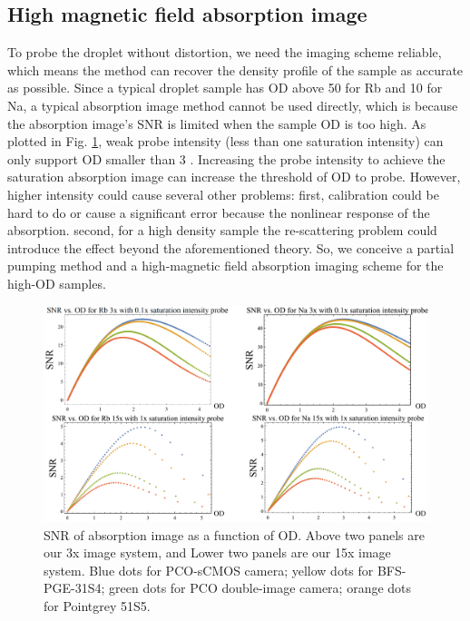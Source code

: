 \subsection{High magnetic field absorption image}
\label{subsec:high_mag_absop_image}

To probe the droplet without distortion, we need the imaging scheme reliable, which means the method can recover the density profile of the sample as accurate as possible. Since a typical droplet sample has OD above 50 for Rb and 10 for Na, a typical absorption image method cannot be used directly, which is because the absorption image's SNR is limited when the sample OD is too high. As plotted in Fig. \ref{SNR_OD}, weak probe intensity (less than one saturation intensity) can only support OD smaller than 3 \cite{guo2021SNR}. Increasing the probe intensity to achieve the saturation absorption image can increase the threshold of OD to probe. However, higher intensity could cause several other problems: first, calibration could be hard to do or cause a significant error because the nonlinear response of the absorption. second, for a high density sample the re-scattering problem could introduce the effect beyond the aforementioned theory. So, we conceive a partial pumping method and a high-magnetic field absorption imaging scheme for the high-OD samples.

\begin{figure}[htb]
\begin{center}
\includegraphics[width = \linewidth]{figures/Apparatus_AI_SNR.pdf}
\end{center}
\caption[SNR of absorption image as a function of OD]{SNR of absorption image as a function of OD. Above two panels are our 3x image system, and Lower two panels are our 15x image system. Blue dots for PCO-sCMOS camera; yellow dots for BFS-PGE-31S4; green dots for PCO double-image camera; orange dots for Pointgrey 51S5.}
\label{SNR_OD}
\end{figure}

